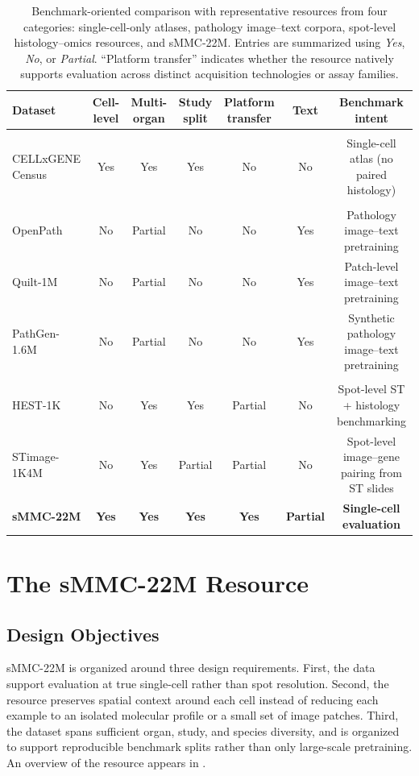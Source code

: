 \documentclass{article}
\newcommand{\dataset}{sMMC-22M\xspace}
\begin{document}
\begin{table}[t]
\centering
\scriptsize
\setlength{\tabcolsep}{3.6pt}
\renewcommand{\arraystretch}{1.15}
\caption{Benchmark-oriented comparison with representative resources from four categories: single-cell-only atlases, pathology image--text corpora, spot-level histology--omics resources, and \dataset. Entries are summarized using \textit{Yes}, \textit{No}, or \textit{Partial}. ``Platform transfer'' indicates whether the resource natively supports evaluation across distinct acquisition technologies or assay families.}
\label{tab:resource_comparison_ed}
\begin{tabular}{lcccccc}
\toprule
Dataset & Cell-level & Multi-organ & Study split & Platform transfer & Text & Benchmark intent \\
\midrule
\rowcolor[gray]{0.94}
\multicolumn{7}{l}{\textit{Single-cell-only atlases}} \\
CELLxGENE Census & Yes & Yes & Yes & No & No & Single-cell atlas (no paired histology) \\
\addlinespace[2pt]
\rowcolor[gray]{0.94}
\multicolumn{7}{l}{\textit{Pathology image--text corpora}} \\
OpenPath & No & Partial & No & No & Yes & Pathology image--text pretraining \\
Quilt-1M & No & Partial & No & No & Yes & Patch-level image--text pretraining \\
PathGen-1.6M & No & Partial & No & No & Yes & Synthetic pathology image--text pretraining \\
\addlinespace[2pt]
\rowcolor[gray]{0.94}
\multicolumn{7}{l}{\textit{ST + histology resources}} \\
HEST-1K & No & Yes & Yes & Partial & No & Spot-level ST + histology benchmarking \\
STimage-1K4M & No & Yes & Partial & Partial & No & Spot-level image--gene pairing from ST slides \\
\addlinespace[2pt]
\rowcolor[rgb]{0.90,0.95,1.00}
\textbf{\dataset} & \textbf{Yes} & \textbf{Yes} & \textbf{Yes} & \textbf{Yes} & \textbf{Partial} & \textbf{Single-cell evaluation} \\
\bottomrule
\end{tabular}
\end{table}

\section{The \dataset Resource}
\subsection{Design Objectives}
\dataset is organized around three design requirements. First, the data support evaluation at true single-cell rather than spot resolution. Second, the resource preserves spatial context around each cell instead of reducing each example to an isolated molecular profile or a small set of image patches. Third, the dataset spans sufficient organ, study, and species diversity, and is organized to support reproducible benchmark splits rather than only large-scale pretraining. An overview of the resource appears in .
\end{document}
